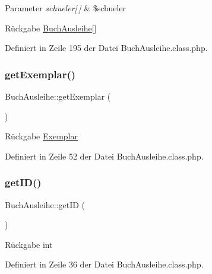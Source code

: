 \begin{DoxyParams}{Parameter}
{\em schueler\mbox{[}$\,$\mbox{]}} & \$schueler \\
\hline
\end{DoxyParams}
\begin{DoxyReturn}{Rückgabe}
\mbox{\hyperlink{class_buch_ausleihe}{Buch\+Ausleihe}}\mbox{[}\mbox{]} 
\end{DoxyReturn}


Definiert in Zeile 195 der Datei Buch\+Ausleihe.\+class.\+php.

\mbox{\label{class_buch_ausleihe_a3be8dd6025b3daf101ffd7cfbe7de314}} 
\subsubsection{\texorpdfstring{get\+Exemplar()}{getExemplar()}}
{\footnotesize\ttfamily Buch\+Ausleihe\+::get\+Exemplar (\begin{DoxyParamCaption}{ }\end{DoxyParamCaption})}

\begin{DoxyReturn}{Rückgabe}
\mbox{\hyperlink{class_exemplar}{Exemplar}} 
\end{DoxyReturn}


Definiert in Zeile 52 der Datei Buch\+Ausleihe.\+class.\+php.

\mbox{\label{class_buch_ausleihe_a9032093212a7ee4aea97d4b489703064}} 
\subsubsection{\texorpdfstring{get\+I\+D()}{getID()}}
{\footnotesize\ttfamily Buch\+Ausleihe\+::get\+ID (\begin{DoxyParamCaption}{ }\end{DoxyParamCaption})}

\begin{DoxyReturn}{Rückgabe}
int 
\end{DoxyReturn}


Definiert in Zeile 36 der Datei Buch\+Ausleihe.\+class.\+php.

\mbox{\label{class_buch_ausleihe_aea7a7f54505b97982c3eaa2c3f69ffcc}} 
